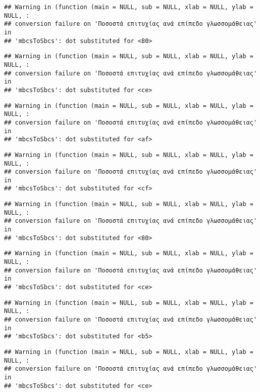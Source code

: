\documentclass[
]{article}
\begin{document}
\begin{verbatim}
## Warning in (function (main = NULL, sub = NULL, xlab = NULL, ylab = NULL, :
## conversion failure on 'Ποσοστά επιτυχίας ανά επίπεδο γλωσσομάθειας' in
## 'mbcsToSbcs': dot substituted for <80>
\end{verbatim}

\begin{verbatim}
## Warning in (function (main = NULL, sub = NULL, xlab = NULL, ylab = NULL, :
## conversion failure on 'Ποσοστά επιτυχίας ανά επίπεδο γλωσσομάθειας' in
## 'mbcsToSbcs': dot substituted for <ce>
\end{verbatim}

\begin{verbatim}
## Warning in (function (main = NULL, sub = NULL, xlab = NULL, ylab = NULL, :
## conversion failure on 'Ποσοστά επιτυχίας ανά επίπεδο γλωσσομάθειας' in
## 'mbcsToSbcs': dot substituted for <af>
\end{verbatim}

\begin{verbatim}
## Warning in (function (main = NULL, sub = NULL, xlab = NULL, ylab = NULL, :
## conversion failure on 'Ποσοστά επιτυχίας ανά επίπεδο γλωσσομάθειας' in
## 'mbcsToSbcs': dot substituted for <cf>
\end{verbatim}

\begin{verbatim}
## Warning in (function (main = NULL, sub = NULL, xlab = NULL, ylab = NULL, :
## conversion failure on 'Ποσοστά επιτυχίας ανά επίπεδο γλωσσομάθειας' in
## 'mbcsToSbcs': dot substituted for <80>
\end{verbatim}

\begin{verbatim}
## Warning in (function (main = NULL, sub = NULL, xlab = NULL, ylab = NULL, :
## conversion failure on 'Ποσοστά επιτυχίας ανά επίπεδο γλωσσομάθειας' in
## 'mbcsToSbcs': dot substituted for <ce>
\end{verbatim}

\begin{verbatim}
## Warning in (function (main = NULL, sub = NULL, xlab = NULL, ylab = NULL, :
## conversion failure on 'Ποσοστά επιτυχίας ανά επίπεδο γλωσσομάθειας' in
## 'mbcsToSbcs': dot substituted for <b5>
\end{verbatim}

\begin{verbatim}
## Warning in (function (main = NULL, sub = NULL, xlab = NULL, ylab = NULL, :
## conversion failure on 'Ποσοστά επιτυχίας ανά επίπεδο γλωσσομάθειας' in
## 'mbcsToSbcs': dot substituted for <ce>
\end{verbatim}
\end{document}
